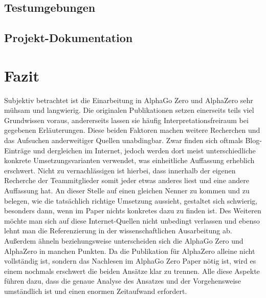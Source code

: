 \documentclass[12pt,a4paper]{article}
\begin{document}

\subsection{Testumgebungen}

\subsection{Projekt-Dokumentation}

\newpage
\section{Fazit}

Subjektiv betrachtet ist die Einarbeitung in AlphaGo Zero und AlphaZero sehr mühsam und langwierig. Die originalen Publikationen setzen einerseits teils viel Grundwissen voraus, andererseits lassen sie häufig Interpretationsfreiraum bei gegebenen Erläuterungen. Diese beiden Faktoren machen weitere Recherchen und das Aufsuchen anderweitiger Quellen unabdingbar. Zwar finden sich oftmals Blog-Einträge und dergleichen im Internet, jedoch werden dort meist unterschiedliche konkrete Umsetzungsvarianten verwendet, was einheitliche Auffassung erheblich erschwert. Nicht zu vernachlässigen ist hierbei, dass innerhalb der eigenen Recherche der Teammitglieder somit jeder etwas anderes liest und eine andere Auffassung hat. An dieser Stelle auf einen gleichen Nenner zu kommen und zu belegen, wie die tatsächlich richtige Umsetzung aussieht, gestaltet sich schwierig, besonders dann, wenn im Paper nichts konkretes dazu zu finden ist. Des Weiteren möchte man sich auf diese Internet-Quellen nicht unbedingt verlassen und ebenso lehnt man die Referenzierung in der wissenschaftlichen Ausarbeitung ab. Außerdem ähneln beziehungsweise unterscheiden sich die AlphaGo Zero und AlphaZero in manchen Punkten. Da die Publikation für AlphaZero alleine nicht vollständig ist, sondern das Nachlesen im AlphaGo Zero Paper nötig ist, wird es einem nochmals erschwert die beiden Ansätze klar zu trennen. Alle diese Aspekte führen dazu, dass die genaue Analyse des Ansatzes und der Vorgehensweise umständlich ist und einen enormen Zeitaufwand erfordert. 
\end{document}

